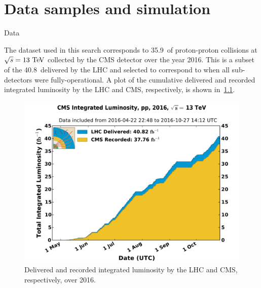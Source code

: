 \chapter{Data samples and simulation}
\begin{section}{Data}

The dataset used in this search corresponds to 35.9~\ifb of proton-proton collisions at $\sqrt{s} = 13~\mathrm{Te\kern -0.1em V}$ collected by the CMS detector over the year 2016.
This is a subset of the 40.8~\ifb delivered by the LHC and selected to correspond to when all sub-detectors were fully-operational.
A plot of the cumulative delivered and recorded integrated luminosity by the LHC and CMS, respectively, is shown in~\ref{fig:lumi_2016}. 

\begin{figure}[tbp!]
\begin{center}
\includegraphics[angle=0,width=0.95\columnwidth]{fig/lumi_2016.pdf}
\end{center}
\caption{Delivered and recorded integrated luminosity by the LHC and CMS, respectively, over 2016.~\cite{lumi_2016}}
\label{fig:lumi_2016}
\end{figure}

\end{section}

